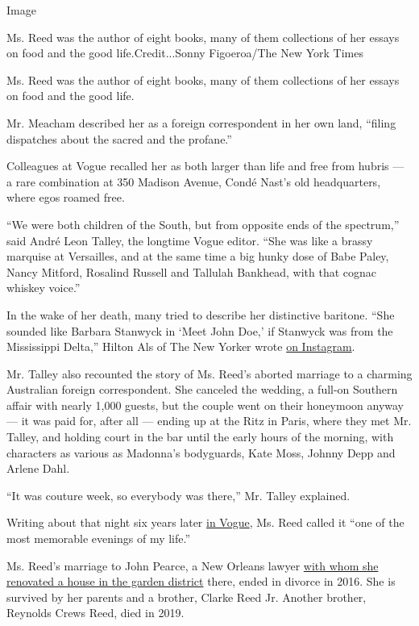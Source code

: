 Image

Ms. Reed was the author of eight books, many of them collections of her
essays on food and the good life.Credit...Sonny Figoeroa/The New York
Times

Ms. Reed was the author of eight books, many of them collections of her
essays on food and the good life.

Mr. Meacham described her as a foreign correspondent in her own land,
``filing dispatches about the sacred and the profane.''

Colleagues at Vogue recalled her as both larger than life and free from
hubris --- a rare combination at 350 Madison Avenue, Condé Nast's old
headquarters, where egos roamed free.

``We were both children of the South, but from opposite ends of the
spectrum,'' said André Leon Talley, the longtime Vogue editor. ``She was
like a brassy marquise at Versailles, and at the same time a big hunky
dose of Babe Paley, Nancy Mitford, Rosalind Russell and Tallulah
Bankhead, with that cognac whiskey voice.''

In the wake of her death, many tried to describe her distinctive
baritone. ``She sounded like Barbara Stanwyck in `Meet John Doe,' if
Stanwyck was from the Mississippi Delta,'' Hilton Als of The New Yorker
wrote \href{https://www.instagram.com/p/CEez249B_9t/}{on Instagram}.

Mr. Talley also recounted the story of Ms. Reed's aborted marriage to a
charming Australian foreign correspondent. She canceled the wedding, a
full-on Southern affair with nearly 1,000 guests, but the couple went on
their honeymoon anyway --- it was paid for, after all --- ending up at
the Ritz in Paris, where they met Mr. Talley, and holding court in the
bar until the early hours of the morning, with characters as various as
Madonna's bodyguards, Kate Moss, Johnny Depp and Arlene Dahl.

``It was couture week, so everybody was there,'' Mr. Talley explained.

Writing about that night six years later
\href{https://archive.vogue.com/article/1996/6/1/dis-engaged}{in Vogue},
Ms. Reed called it ``one of the most memorable evenings of my life.''

Ms. Reed's marriage to John Pearce, a New Orleans lawyer
\href{https://www.elledecor.com/design-decorate/house-interiors/g254/greek-revival-interiors-julia-reed/?slide=1}{with
whom she renovated a house in the garden district} there, ended in
divorce in 2016. She is survived by her parents and a brother, Clarke
Reed Jr. Another brother, Reynolds Crews Reed, died in 2019.

